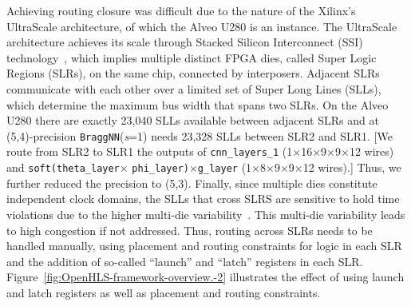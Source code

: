 \documentclass[10pt]{sig-alternate}
\begin{document}
Achieving routing closure was difficult due to the nature of
the Xilinx's UltraScale architecture, of which the Alveo U280 is an
instance. The UltraScale architecture achieves its scale through Stacked
Silicon Interconnect (SSI) technology~\cite{leibson2013xilinx},
which implies multiple distinct FPGA dies, called Super Logic Regions
(SLRs), on the same chip, connected by interposers. Adjacent SLRs
communicate with each other over a limited set of Super Long Lines
(SLLs), which determine the maximum bus width that spans two
SLRs. On the Alveo U280 there are exactly 23,040 SLLs available between
adjacent SLRs and at (5,4)-precision \texttt{BraggNN}(\emph{s}\/=1)
needs 23,328 SLLs between SLR2 and SLR1.
[We route from SLR2 to SLR1 the outputs of \texttt{cnn\_layers\_1} (1$\times$16$\times$9$\times$9$\times$12
wires) and \texttt{soft(theta\_layer}$\times$ \texttt{phi\_layer)}$\times$\texttt{g\_layer} (1$\times$8$\times$9$\times$9$\times$12 wires).] Thus, we further reduced the precision to (5,3). Finally,
since multiple dies constitute independent clock domains, the SLLs
that cross SLRS are sensitive to hold time violations due to the higher
multi-die variability~\cite{rapidwright}. This multi-die variability
leads to high congestion if not addressed. Thus, routing across SLRs
needs to be handled manually, using placement and routing constraints
for logic in each SLR and the addition of so-called ``launch'' and
``latch'' registers in each SLR.
Figure~\ref{fig:OpenHLS-framework-overview.-2} illustrates the effect of using launch and latch registers as well as placement and routing constraints.
\end{document}
